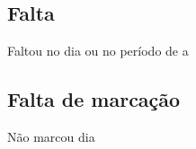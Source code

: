 \documentclass[openright, oneside, a4paper, article, brazil]{abntex2}
\begin{document}
\setasuspacing{\SingleSpacing} %
\begin{framed}
  \centering
  \vspace*{-3ex}
  \subsection{Falta}
  \noindent
  \small
  Faltou no dia  ou no período de  a 
\end{framed}
\begin{framed}%
  \centering\vspace*{-3ex}
  \subsection{Falta de marcação}
  \noindent\small Não marcou dia 
  \vspace{\baselineskip}%

  \footnotesize %
  \begin{minipage}{0.25\linewidth}
  \end{minipage}%
  \begin{minipage}{0.25\linewidth}
  \end{minipage}%
  \begin{minipage}{0.25\linewidth}
  \end{minipage}%
  \begin{minipage}{0.25\linewidth}
  \end{minipage}
\end{framed}
\vspace{\baselineskip}
\end{document}
